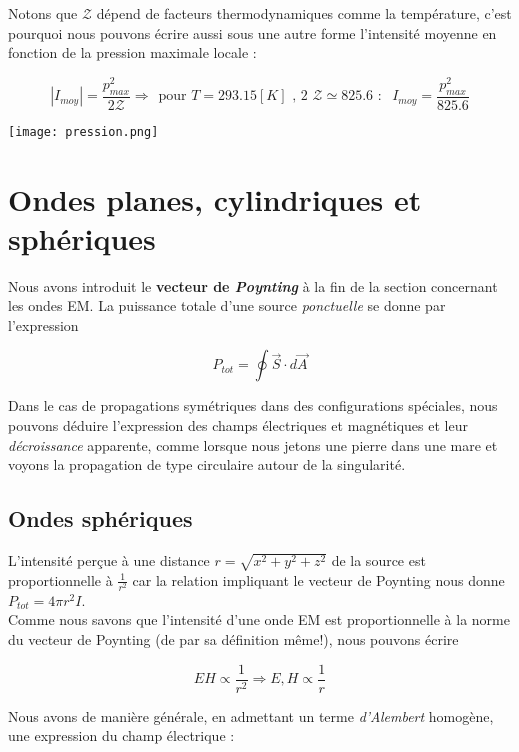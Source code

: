 Notons que $\mathcal{Z}$ dépend de facteurs thermodynamiques comme la température, c'est pourquoi nous pouvons écrire aussi sous une autre forme l'intensité moyenne en fonction de
la pression maximale locale : 

\[ |I_{moy}| = \frac{p_{max}^{2}}{2 \mathcal{Z}} \Rightarrow \hspace{5pt} \mbox{pour $T = 293.15[K]$ , 2 $\mathcal{Z} \simeq 825.6$  : } \hspace{5pt} I_{moy} = \frac{p_{max}^{2}}{825.6}\]

\begin{center}
	\texttt{[image: pression.png]}
\end{center}

\section{Ondes planes, cylindriques et sphériques}

Nous avons introduit le \textbf{vecteur de \textit{Poynting}} à la fin de la section concernant les ondes EM. La puissance totale d'une source \textit{ponctuelle} se donne par l'expression 

\[P_{tot} = \oint \vec{S} \cdot d\vec{A}\]

Dans le cas de propagations symétriques dans des configurations spéciales, nous pouvons déduire l'expression des champs électriques et magnétiques et leur \textit{décroissance} apparente, comme 
lorsque nous jetons une pierre dans une mare et voyons la propagation de type circulaire autour de la singularité. 

\subsection{Ondes sphériques} 

L'intensité perçue à une distance $r = \sqrt{x^{2} + y^{2} + z^{2}}$ de la source est proportionnelle à $\frac{1}{r^{2}}$ car la relation impliquant le vecteur de Poynting nous 
donne $P_{tot} = 4 \pi r^{2} I$. \\ 
Comme nous savons que l'intensité d'une onde EM est proportionnelle à la norme du vecteur de Poynting (de par sa définition même!), nous pouvons écrire 

\[ EH \propto \frac{1}{r^{2}} \Rightarrow E,H \propto \frac{1}{r}\]

Nous avons de manière générale, en admettant un terme \textit{d'Alembert} homogène, une expression du champ électrique : 

